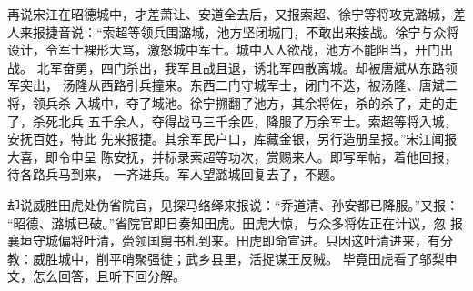 再说宋江在昭德城中，才差萧让、安道全去后，又报索超、徐宁等将攻克潞城，差
人来报捷音说：“索超等领兵围潞城，池方坚闭城门，不敢出来接战。徐宁与众将
设计，令军士裸形大骂，激怒城中军士。城中人人欲战，池方不能阻当，开门出战。
北军奋勇，四门杀出，我军且战且退，诱北军四散离城。却被唐斌从东路领军突出，
汤隆从西路引兵撞来。东西二门守城军士，闭门不迭，被汤隆、唐斌二将，领兵杀
入城中，夺了城池。徐宁搠翻了池方，其余将佐，杀的杀了，走的走了，杀死北兵
五千余人，夺得战马三千余匹，降服了万余军士。索超等将入城，安抚百姓，特此
先来报捷。其余军民户口，库藏金银，另行造册呈报。”宋江闻报大喜，即令申呈
陈安抚，并标录索超等功次，赏赐来人。即写军帖，着他回报，待各路兵马到来，
一齐进兵。军人望潞城回复去了，不题。

却说威胜田虎处伪省院官，见探马络绎来报说：“乔道清、孙安都已降服。”又报：
“昭德、潞城已破。”省院官即日奏知田虎。田虎大惊，与众多将佐正在计议，忽
报襄垣守城偏将叶清，赍领国舅书札到来。田虎即命宣进。只因这叶清进来，有分
教：威胜城中，削平哨聚强徒；武乡县里，活捉谋王反贼。
毕竟田虎看了邬梨申文，怎么回答，且听下回分解。